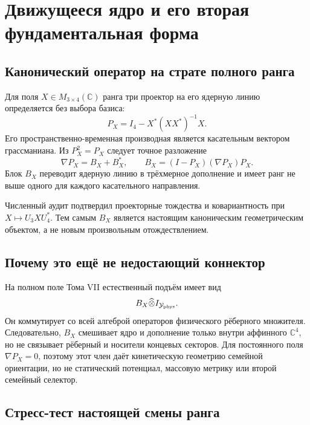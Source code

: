 \chapter{Движущееся ядро и его вторая фундаментальная форма}
\label{ch:v8-moving-kernel-second-fundamental-form-gate}

\section{Канонический оператор на страте полного ранга}

Для поля $X\in M_{3\times4}(\mathbb C)$ ранга три проектор на его ядерную
линию определяется без выбора базиса:
\begin{equation}
 P_X=I_4-X^*(XX^*)^{-1}X.
 \label{eq:v8-moving-kernel-projector}
\end{equation}
Его пространственно-временная производная является касательным вектором
грассманиана. Из $P_X^2=P_X$ следует точное разложение
\begin{equation}
 \nabla P_X=B_X+B_X^*,
 \qquad
 B_X=(I-P_X)(\nabla P_X)P_X.
 \label{eq:v8-moving-kernel-second-form}
\end{equation}
Блок $B_X$ переводит ядерную линию в трёхмерное дополнение и имеет ранг не
выше одного для каждого касательного направления.

Численный аудит подтвердил проекторные тождества и ковариантность при
$X\mapsto U_3XU_4^*$. Тем самым $B_X$ является настоящим каноническим
геометрическим объектом, а не новым произвольным отождествлением.

\section{Почему это ещё не недостающий коннектор}

На полном поле Тома VII естественный подъём имеет вид
\begin{equation}
 B_X\widehat\otimes I_{\mathcal Y_{\rm phys}}.
\end{equation}
Он коммутирует со всей алгеброй операторов физического рёберного множителя.
Следовательно, $B_X$ смешивает ядро и дополнение только внутри аффинного
$\mathbb C^4$, но не связывает рёберный и носители концевых секторов. Для постоянного
поля $\nabla P_X=0$, поэтому этот член даёт кинетическую геометрию семейной
ориентации, но не статический потенциал, массовую метрику или второй
семейный селектор.

\section{Стресс-тест настоящей смены ранга}

